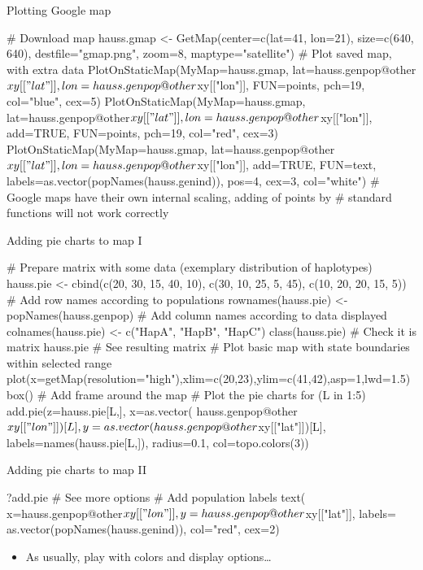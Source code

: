 \documentclass[compress, xelatex, 11pt, xcolor=svgnames, aspectratio=169,
	hyperref={
		bookmarks=true,
		unicode=true,
		colorlinks=true,
		pdftitle={Molecular data in R},
		plainpages=false,
		pdfauthor={Vojtech Zeisek},
		pdfsubject={Course about phylogeny and evolution in R},
		pdfcreator={XeLaTeX},
		pdfkeywords={R, evolution, phylogeny, molecular data},
		linkcolor=Crimson, %
		anchorcolor=Magenta, %
		citecolor=Magenta, %
		filecolor=Magenta, %
		menucolor=Magenta, %
		urlcolor=DodgerBlue, %
		},
	url={hyphens, lowtilde} %
	]{beamer}
\renewcommand{\texttt}[1]{\colorbox{Beige}{{\ttfamily #1}}}
\begin{document}
\begin{frame}[fragile]{Plotting Google map}
	\begin{spluscode}
    # Download map
    hauss.gmap <- GetMap(center=c(lat=41, lon=21), size=c(640, 640),
      destfile="gmap.png", zoom=8, maptype="satellite")
    # Plot saved map, with extra data
    PlotOnStaticMap(MyMap=hauss.gmap, lat=hauss.genpop@other$xy[["lat"]],
      lon=hauss.genpop@other$xy[["lon"]], FUN=points, pch=19, col="blue",
      cex=5)
    PlotOnStaticMap(MyMap=hauss.gmap, lat=hauss.genpop@other$xy[["lat"]],
      lon=hauss.genpop@other$xy[["lon"]], add=TRUE, FUN=points, pch=19,
      col="red", cex=3)
    PlotOnStaticMap(MyMap=hauss.gmap, lat=hauss.genpop@other$xy[["lat"]],
      lon=hauss.genpop@other$xy[["lon"]], add=TRUE, FUN=text,
      labels=as.vector(popNames(hauss.genind)), pos=4, cex=3, col="white")
    # Google maps have their own internal scaling, adding of points by
    # standard functions will not work correctly
	\end{spluscode}
\end{frame}

\begin{frame}[fragile]{Adding pie charts to map I}
	\begin{spluscode}
    # Prepare matrix with some data (exemplary distribution of haplotypes)
    hauss.pie <- cbind(c(20, 30, 15, 40, 10), c(30, 10, 25, 5, 45),
      c(10, 20, 20, 15, 5))
    # Add row names according to populations
    rownames(hauss.pie) <- popNames(hauss.genpop)
    # Add column names according to data displayed
    colnames(hauss.pie) <- c("HapA", "HapB", "HapC")
    class(hauss.pie) # Check it is matrix
    hauss.pie # See resulting matrix
    # Plot basic map with state boundaries within selected range
    plot(x=getMap(resolution="high"),xlim=c(20,23),ylim=c(41,42),asp=1,lwd=1.5)
    box() # Add frame around the map
    # Plot the pie charts
    for (L in 1:5) { add.pie(z=hauss.pie[L,], x=as.vector(
      hauss.genpop@other$xy[["lon"]])[L], y=as.vector(
      hauss.genpop@other$xy[["lat"]])[L], labels=names(hauss.pie[L,]),
      radius=0.1, col=topo.colors(3)) }
	\end{spluscode}
\end{frame}

\begin{frame}[fragile]{Adding pie charts to map II}
	\begin{multicols}{2}
		\begin{spluscode}
    ?add.pie # See more options
    # Add population labels
    text(
      x=hauss.genpop@other$xy[["lon"]],
      y=hauss.genpop@other$xy[["lat"]],
      labels=
      as.vector(popNames(hauss.genind)),
      col="red", cex=2)
		\end{spluscode}
		\begin{itemize}
			\item As usually, play with colors and display options\ldots
		\end{itemize}
		\begin{center}
			\texttt{[image: map\_pie.png]}
		\end{center}
	\end{multicols}
\end{frame}
\end{document}
